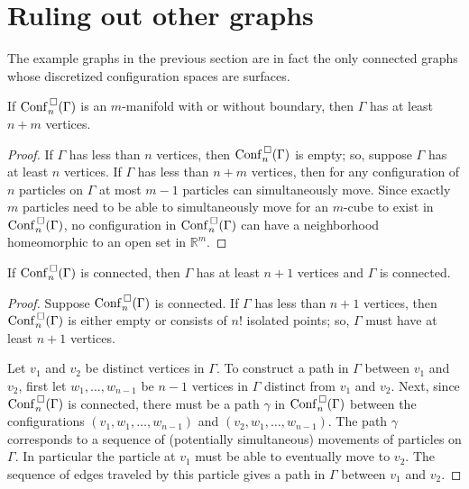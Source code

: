 
\section{Ruling out other graphs}
The example graphs in the previous section are in fact the only connected graphs
whose discretized configuration spaces are surfaces.

\begin{lem}
\label{lem:is_surface_0}
If \(\mathrm{Conf}^{\,\square}_n(\Gamma)\) is an \(m\)-manifold with or without boundary, then \(\Gamma\) has at least \(n+m\) vertices.
\end{lem}
\begin{proof}
    If \(\Gamma\) has less than \(n\) vertices, then \(\mathrm{Conf}^{\,\square}_n(\Gamma)\) is empty;
    so, suppose \(\Gamma\) has at least \(n\) vertices.
    If \(\Gamma\) has less than \(n + m\) vertices, then
    for any configuration of \(n\) particles on \(\Gamma\)
    at most \(m-1\) particles can simultaneously move.
    Since exactly \(m\) particles need to be able to simultaneously move for an \(m\)-cube 
    to exist in \(\mathrm{Conf}^{\,\square}_n(\Gamma)\), no configuration in \(\mathrm{Conf}^{\,\square}_n(\Gamma)\)
    can have a neighborhood homeomorphic to an open set in \(\mathbb{R}^m\).
\end{proof}

\begin{lem}
    \label{lem:is_connected_0}
    If \(\mathrm{Conf}^{\,\square}_n(\Gamma)\) is connected, then \(\Gamma\) has at least \(n + 1\) vertices
    and \(\Gamma\) is connected.
\end{lem}
\begin{proof}
    Suppose \(\mathrm{Conf}^{\,\square}_n(\Gamma)\) is connected.
    If \(\Gamma\) has less than \(n + 1\) vertices, then \(\mathrm{Conf}^{\,\square}_n(\Gamma)\) is either empty or
    consists of \(n!\) isolated points; so, \(\Gamma\) must have at least \(n+1\) vertices.

    Let \(v_1\) and \(v_2\) be distinct vertices in \(\Gamma\).
    To construct a path in \(\Gamma\) between \(v_1\) and \(v_2\), first let \(w_1, \ldots, w_{n-1}\)
    be \(n-1\) vertices in \(\Gamma\) distinct from \(v_1\) and \(v_2\).
    Next, since \(\mathrm{Conf}^{\,\square}_n(\Gamma)\) is connected, there must be a path \(\gamma\)
    in \(\mathrm{Conf}^{\,\square}_n(\Gamma)\) between the configurations
    \((v_1, w_1, \ldots, w_{n-1})\) and \((v_2, w_1, \ldots, w_{n-1})\).
    The path \(\gamma\) corresponds to a sequence of (potentially simultaneous) movements of particles on \(\Gamma\).
    In particular the particle at \(v_1\) must be able to eventually move to \(v_2\).
    The sequence of edges traveled by this particle gives a path in \(\Gamma\) between \(v_1\) and \(v_2\).
\end{proof}


